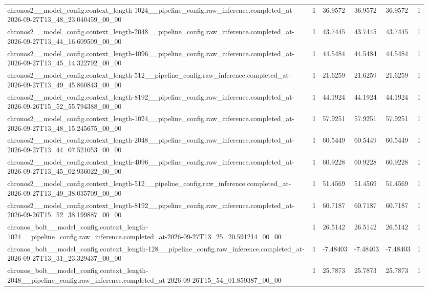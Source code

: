 \begin{tabular}{llllll}
chronos2\_\_model\_config.context\_length-1024\_\_pipeline\_config.raw\_inference.completed\_at-2026-09-27T13\_48\_23.040459\_00\_00 & 1 & 36.9572 & 36.9572 & 36.9572 & 1 \\
chronos2\_\_model\_config.context\_length-2048\_\_pipeline\_config.raw\_inference.completed\_at-2026-09-27T13\_44\_16.609509\_00\_00 & 1 & 43.7445 & 43.7445 & 43.7445 & 1 \\
chronos2\_\_model\_config.context\_length-4096\_\_pipeline\_config.raw\_inference.completed\_at-2026-09-27T13\_45\_14.322792\_00\_00 & 1 & 44.5484 & 44.5484 & 44.5484 & 1 \\
chronos2\_\_model\_config.context\_length-512\_\_pipeline\_config.raw\_inference.completed\_at-2026-09-27T13\_49\_45.860843\_00\_00 & 1 & 21.6259 & 21.6259 & 21.6259 & 1 \\
chronos2\_\_model\_config.context\_length-8192\_\_pipeline\_config.raw\_inference.completed\_at-2026-09-26T15\_52\_55.794388\_00\_00 & 1 & 44.1924 & 44.1924 & 44.1924 & 1 \\
chronos2\_\_model\_config.context\_length-1024\_\_pipeline\_config.raw\_inference.completed\_at-2026-09-27T13\_48\_15.245675\_00\_00 & 1 & 57.9251 & 57.9251 & 57.9251 & 1 \\
chronos2\_\_model\_config.context\_length-2048\_\_pipeline\_config.raw\_inference.completed\_at-2026-09-27T13\_44\_07.521053\_00\_00 & 1 & 60.5449 & 60.5449 & 60.5449 & 1 \\
chronos2\_\_model\_config.context\_length-4096\_\_pipeline\_config.raw\_inference.completed\_at-2026-09-27T13\_45\_02.936022\_00\_00 & 1 & 60.9228 & 60.9228 & 60.9228 & 1 \\
chronos2\_\_model\_config.context\_length-512\_\_pipeline\_config.raw\_inference.completed\_at-2026-09-27T13\_49\_38.035709\_00\_00 & 1 & 51.4569 & 51.4569 & 51.4569 & 1 \\
chronos2\_\_model\_config.context\_length-8192\_\_pipeline\_config.raw\_inference.completed\_at-2026-09-26T15\_52\_38.199887\_00\_00 & 1 & 60.7187 & 60.7187 & 60.7187 & 1 \\
chronos\_bolt\_\_model\_config.context\_length-1024\_\_pipeline\_config.raw\_inference.completed\_at-2026-09-27T13\_25\_20.591214\_00\_00 & 1 & 26.5142 & 26.5142 & 26.5142 & 1 \\
chronos\_bolt\_\_model\_config.context\_length-128\_\_pipeline\_config.raw\_inference.completed\_at-2026-09-27T13\_31\_23.329437\_00\_00 & 1 & -7.48403 & -7.48403 & -7.48403 & 1 \\
chronos\_bolt\_\_model\_config.context\_length-2048\_\_pipeline\_config.raw\_inference.completed\_at-2026-09-26T15\_54\_01.859387\_00\_00 & 1 & 25.7873 & 25.7873 & 25.7873 & 1 \\

\end{tabular}
